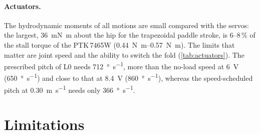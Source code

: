 \paragraph{Actuators.} The hydrodynamic moments of all motions are small compared with the servos: the largest, \SI{36}{\milli\newton\metre}
about the hip for the trapezoidal paddle stroke, is 6--8\,\% of the stall torque of the PTK\,7465W (\SIrange{0.44}{0.57}{\newton\metre}).
The limits that matter are joint speed and the ability to switch the fold (\cref{tab:actuators}). The prescribed pitch of L0 needs
\SI{712}{\degree\per\second}, more than the no-load speed at \SI{6}{\volt} (\SI{650}{\degree\per\second}) and close to that at
\SI{8.4}{\volt} (\SI{860}{\degree\per\second}), whereas the speed-scheduled pitch at \SI{0.30}{\metre\per\second} needs only \SI{366}{\degree\per\second}.

\section{Limitations}
\label{sec:disc-limits}

